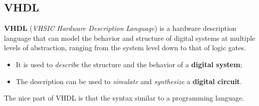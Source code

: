 \documentclass[a4paper,11pt]{article}
\begin{document}
\subsection{VHDL}

\textbf{VHDL} (\textit{VHSIC Hardware Description Language}) is a hardware description language that can model the behavior and structure of digital systems at multiple levels of abstraction, ranging from the system level down to that of logic gates.

\begin{itemize}
	\item It is used to \textit{describe} the structure and the behavior of a \textbf{digital system};
	\item The description can be used to \textit{simulate} and \textit{synthesize} a \textbf{digital circuit}.
\end{itemize}

The nice part of VHDL is that the syntax similar to a programming language.
\end{document}

